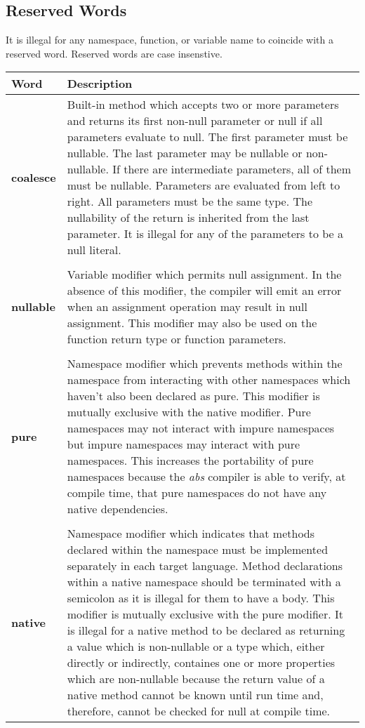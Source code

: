 \documentclass[hidelinks]{article}
\begin{document}
\subsection{Reserved Words}
It is illegal for any namespace, function, or variable name to coincide with a reserved word. Reserved words are case insenstive.
\begin{longtable}{ |p{4cm}|p{11cm}|  }
\hline
\textbf{Word} & \textbf{Description} \\
\hline
\textbf{coalesce} & Built-in method which accepts two or more parameters and returns its first non-null parameter or null if all parameters evaluate to null. The first parameter must be nullable. The last parameter may be nullable or non-nullable. If there are intermediate parameters, all of them must be nullable. Parameters are evaluated from left to right. All parameters must be the same type. The nullability of the return is inherited from the last parameter. It is illegal for any of the parameters to be a null literal.\\
&\\
\textbf{nullable} & Variable modifier which permits null assignment. In the absence of this modifier, the compiler will emit an error when an assignment operation may result in null assignment. This modifier may also be used on the function return type or function parameters. \\
&\\
\textbf{pure} & Namespace modifier which prevents methods within the namespace from interacting with other namespaces which haven't also been declared as pure. This modifier is mutually exclusive with the native modifier. Pure namespaces may not interact with impure namespaces but impure namespaces may interact with pure namespaces. This increases the portability of pure namespaces because the \textit{abs} compiler is able to verify, at compile time, that pure namespaces do not have any native dependencies.\\
&\\
\textbf{native} & Namespace modifier which indicates that methods declared within the namespace must be implemented separately in each target language. Method declarations within a native namespace should be terminated with a semicolon as it is illegal for them to have a body. This modifier is mutually exclusive with the pure modifier. It is illegal for a native method to be declared as returning a value which is non-nullable or a type which, either directly or indirectly, containes one or more properties which are non-nullable because the return value of a native method cannot be known until run time and, therefore, cannot be checked for null at compile time.\\

\end{longtable}
\end{document}
